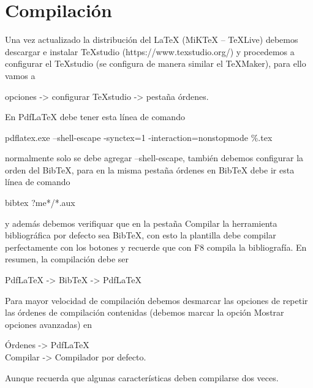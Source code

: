 {	\section{Compilación}\label{sec:compilacion}
	Una vez actualizado la distribución del LaTeX (MiKTeX – TeXLive) debemos descargar e instalar TeXstudio (https://www.texstudio.org/) y procedemos a configurar el TeXstudio (se configura de manera similar el TeXMaker), para ello vamos a 
	\begin{center}
		opciones -> configurar TeXstudio -> pestaña órdenes.
	\end{center}
	En PdfLaTeX debe tener esta línea de comando
	\begin{center}
		pdflatex.exe --shell-escape -synctex=1 -interaction=nonstopmode \%.tex
	\end{center}
	normalmente solo se debe agregar --shell-escape, también debemos configurar la orden del BibTeX, para en la misma pestaña órdenes en BibTeX debe ir esta línea de comando
	\begin{center}
		bibtex ?me*/*.aux
	\end{center}
	y además debemos verifiquar que en la pestaña Compilar la herramienta bibliográfica por defecto sea BibTeX, con esto la plantilla debe compilar perfectamente con los botones  y  recuerde que con F8 compila la bibliografía. En resumen, la compilación debe ser 
	\begin{center}
		PdfLaTeX -> BibTeX -> PdfLaTeX
	\end{center}
	\begin{mybox}[Nota]
		Para mayor velocidad de compilación debemos desmarcar las opciones de repetir las órdenes de compilación contenidas (debemos marcar la opción Mostrar opciones avanzadas) en
		\begin{center}
			Órdenes -> PdfLaTeX\\
		    Compilar -> Compilador por defecto.
		\end{center}
		Aunque recuerda que algunas características deben compilarse dos veces.
	\end{mybox}
	
}\cleanalldata
